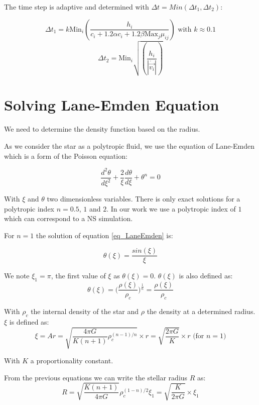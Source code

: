 \documentclass{article}
\begin{document}
The time step is adaptive and determined with $\Delta t = Min(\Delta t_1, \Delta t_2)$:

$$ \Delta t_1 = k \mbox{Min}_i(\frac{h_i}{c_i+1.2\alpha c_i + 1.2 \beta \mbox{Max}_j\mu_{ij}}) \mbox{ with } k \approx 0.1 $$
$$ \Delta t_2 = \mbox{Min}_i\sqrt{(\frac{h_i}{|\dot{\vec{v_i}}|})} $$

\section{Solving Lane-Emden Equation}

We need to determine the density function based on the radius.

As we consider the star as a polytropic fluid, we use the equation of Lane-Emden which is a form of the Poisson equation:

\begin{equation}\label{eq_LaneEmden}
  \frac{d^2\theta}{d \xi^2}+ \frac{2}{\xi}\frac{d\theta}{d\xi}+\theta^n = 0
\end{equation}

With $\xi$ and $\theta$ two dimensionless variables.
There is only exact solutions for a polytropic index $n = 0.5$, $1$ and $2$.
In our work we use a polytropic index of $1$ which can correspond to a NS simulation.

For $n=1$ the solution of equation \ref{eq_LaneEmden} is:

\begin{equation}
\theta(\xi)=\frac{sin(\xi)}{\xi}
\end{equation}

We note $\xi_1 = \pi$, the first value of $\xi$ as $\theta(\xi) = 0$.
$\theta(\xi)$ is also defined as:
\begin{equation}
 \theta(\xi) = \Big(\frac{\rho(\xi)}{\rho_c}\Big)^{\frac{1}{n}}  = \frac{\rho(\xi)}{\rho_c}
\end{equation}

With $\rho_c$ the internal density of the star and $\rho$ the density at a determined radius. $\xi$ is defined as:
$$ \xi = Ar = \sqrt{\frac{4\pi G}{K(n+1)}\rho_c^{(n-1)/n}} \times r = \sqrt{\frac{2\pi G}{K}}\times r \mbox{ (for } n=1 \mbox{)}$$

With $K$ a proportionality constant.

From the previous equations we can write the stellar radius $R$ as:
\begin{equation}
R = \sqrt{\frac{K(n+1)}{4\pi G}}\rho_c^{(1-n)/2}\xi_1 = \sqrt{ \frac{K}{2\pi G} } \times \xi_1
\end{equation}
\end{document}
